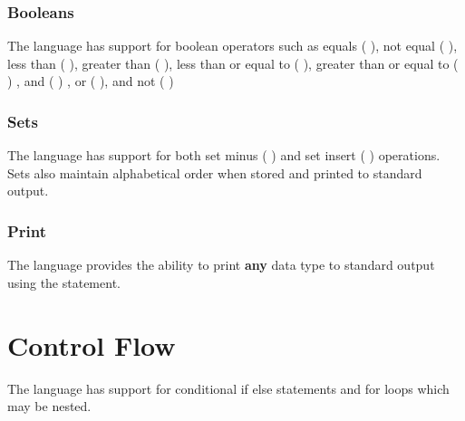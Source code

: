 \documentclass{article}
\begin{document}

\subsubsection{Booleans}
The language has support for boolean operators such as equals ( \EQ), not equal 
( \NEQ), less than ( \LT), greater than ( \GT), less than or equal to ( \LTE), 
greater than or equal to ( \GTE) , and ( \AND) , or ( \OR), and not ( \NOT)\\


\subsubsection{Sets}
The language has support for both set minus ( \SETMINUS) and set insert 
( \INSERT) operations. Sets also maintain alphabetical order when stored and 
printed to standard output.


\subsubsection{Print}
The language provides the ability to print \textbf{any} data type to standard 
output using the \PRINT statement.\\

\section{Control Flow}
The language has support for conditional if else statements and for loops which 
may be nested.
\end{document}
